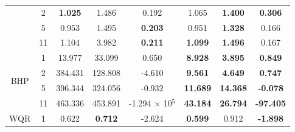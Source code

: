 \begin{table}[tbp]
{\begin{tabular}{|c|c|ccc|ccc|}
                                   & 2                                & \multicolumn{1}{c|}{\textbf{1.025}} & \multicolumn{1}{c|}{1.486}          & 0.192                    & \multicolumn{1}{c|}{1.065}           & \multicolumn{1}{c|}{\textbf{1.400}}  & \textbf{0.306}                    \\ \cline{2-8} 
                                   & 5                                & \multicolumn{1}{c|}{0.953}          & \multicolumn{1}{c|}{1.495}          & \textbf{0.203}           & \multicolumn{1}{c|}{0.951}           & \multicolumn{1}{c|}{\textbf{1.328}}  & 0.166                             \\ \cline{2-8} 
                                   & 11                               & \multicolumn{1}{c|}{1.104}          & \multicolumn{1}{c|}{3.982}          & \textbf{0.211}           & \multicolumn{1}{c|}{\textbf{1.099}}  & \multicolumn{1}{c|}{\textbf{1.496}}  & 0.167                             \\ \hline
\multirow{4}{*}{BHP}               & 1                                & \multicolumn{1}{c|}{13.977}         & \multicolumn{1}{c|}{33.099}         & 0.650                    & \multicolumn{1}{c|}{\textbf{8.928}}  & \multicolumn{1}{c|}{\textbf{3.895}}  & \textbf{0.849}                    \\ \cline{2-8} 
                                   & 2                                & \multicolumn{1}{c|}{384.431}        & \multicolumn{1}{c|}{128.808}        & -4.610                   & \multicolumn{1}{c|}{\textbf{9.561}}  & \multicolumn{1}{c|}{\textbf{4.649}}  & \textbf{0.747}                    \\ \cline{2-8} 
                                   & 5                                & \multicolumn{1}{c|}{396.344}        & \multicolumn{1}{c|}{324.056}        & -0.932                   & \multicolumn{1}{c|}{\textbf{11.689}} & \multicolumn{1}{c|}{\textbf{14.368}} & \textbf{-0.078}                   \\ \cline{2-8} 
                                   & 11                               & \multicolumn{1}{c|}{463.336}        & \multicolumn{1}{c|}{453.891}        & -1.294 $\times$ 10$^{5}$ & \multicolumn{1}{c|}{\textbf{43.184}} & \multicolumn{1}{c|}{\textbf{26.794}} & \textbf{-97.405}                  \\ \hline
\multirow{4}{*}{WQR}               & 1                                & \multicolumn{1}{c|}{0.622}          & \multicolumn{1}{c|}{\textbf{0.712}} & -2.624                   & \multicolumn{1}{c|}{\textbf{0.599}}  & \multicolumn{1}{c|}{0.912}           & \textbf{-1.898}                   \\ \cline{2-8} 

\end{tabular}}
\end{table}
